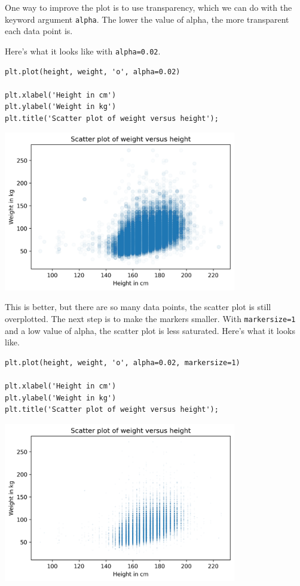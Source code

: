 One way to improve the plot is to use transparency, which we can do with
the keyword argument \passthrough{\lstinline!alpha!}. The lower the
value of alpha, the more transparent each data point is.

Here's what it looks like with \passthrough{\lstinline!alpha=0.02!}.

\begin{lstlisting}[]
plt.plot(height, weight, 'o', alpha=0.02)

plt.xlabel('Height in cm')
plt.ylabel('Weight in kg')
plt.title('Scatter plot of weight versus height');
\end{lstlisting}

\begin{center}
\includegraphics[width=4in]{chapters/09_relationships_files/09_relationships_14_0.png}
\end{center}

This is better, but there are so many data points, the scatter plot is
still overplotted. The next step is to make the markers smaller. With
\passthrough{\lstinline!markersize=1!} and a low value of alpha, the
scatter plot is less saturated. Here's what it looks like.

\begin{lstlisting}[]
plt.plot(height, weight, 'o', alpha=0.02, markersize=1)

plt.xlabel('Height in cm')
plt.ylabel('Weight in kg')
plt.title('Scatter plot of weight versus height');
\end{lstlisting}

\begin{center}
\includegraphics[width=4in]{chapters/09_relationships_files/09_relationships_16_0.png}
\end{center}

